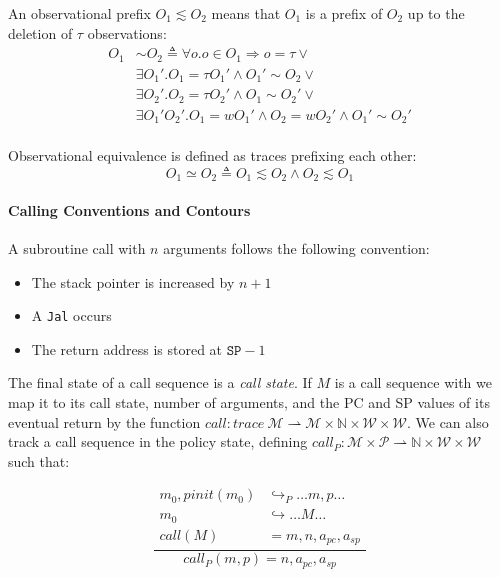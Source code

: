 \documentclass[conference]{IEEEtran}
\begin{document}
    An observational prefix \(O_1 \lesssim O_2\) means that \(O_1\) is a prefix of \(O_2\) up to the deletion
    of \(\tau\) observations:
    \[\begin{split}
      O_1 & \sim O_2 \triangleq \forall o . o \in O_1 \Rightarrow o = \tau \lor \\
      & \exists O_1' . O_1 = \tau O_1' \land O_1' \sim O_2 \lor \\
      & \exists O_2' .  O_2 = \tau O_2' \land O_1 \sim O_2' \lor \\
      & \exists O_1' O_2' . O_1 = w O_1' \land O_2 = w O_2' \land O_1' \sim O_2' \\
    \end{split}\]
    
    Observational equivalence is defined as traces prefixing each other:
    \[O_1 \simeq O_2 \triangleq O_1 \lesssim O_2 \land O_2 \lesssim O_1\]

  \paragraph{Calling Conventions and Contours}

      A subroutine call with \(n\) arguments follows the following convention:

      \begin{itemize}
        \item The stack pointer is increased by \(n+1\)
        \item A {\tt Jal} occurs
        \item The return address is stored at \(\mathtt{SP} - 1\)
      \end{itemize}

      The final state of a call sequence is a {\it call state}. If \(M\) is a call sequence with
      we map it to its call state, number of arguments, and the PC and SP values of its eventual
      return by the function \(\mathit{call} : \mathit{trace}\ \mathcal{M} \rightharpoonup \mathcal{M}
      \times \mathbb{N} \times \mathcal{W} \times \mathcal{W}\). We can also track a call sequence in the
      policy state, defining \(\mathit{call}_P : \mathcal{M} \times \mathcal{P} \rightharpoonup \mathbb{N}
      \times \mathcal{W} \times \mathcal{W}\) such that:

      \[\frac{\begin{split}
        m_0,\mathit{pinit}(m_0) & \hookrightarrow_P \dots m,p \dots \\ %
        m_0 & \hookrightarrow \dots M \dots \\
        \mathit{call}(M) & = m, n, a_{pc}, a_{sp}\end{split}}
             {\mathit{call}_P(m,p) = n, a_{pc}, a_{sp}}\]
\end{document}
